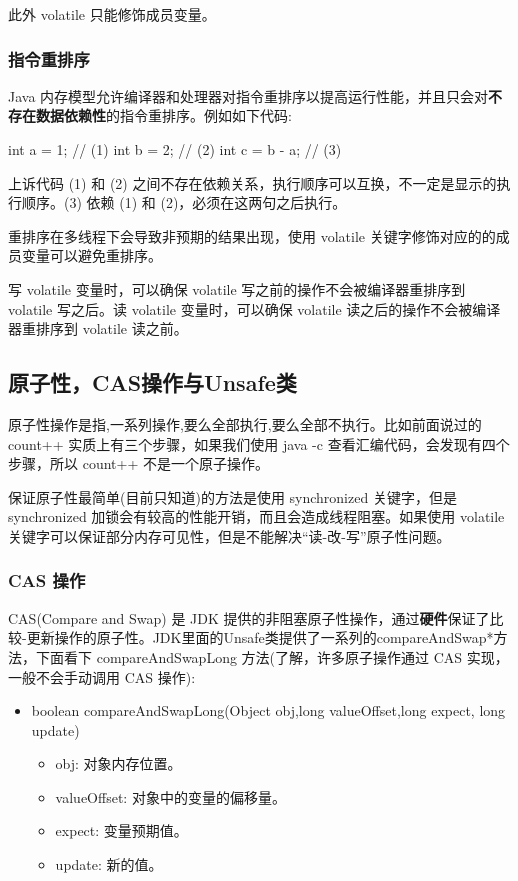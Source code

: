 此外 volatile 只能修饰成员变量。

\subsubsection*{指令重排序}

Java 内存模型允许编译器和处理器对指令重排序以提高运行性能，并且只会对\textbf{不存在数据依赖性}的指令重排序。例如如下代码:

\begin{Java}
int a = 1;      // (1)
int b = 2;      // (2)
int c = b - a;  // (3)
\end{Java}

上诉代码 (1) 和 (2) 之间不存在依赖关系，执行顺序可以互换，不一定是显示的执行顺序。(3) 依赖 (1) 和 (2)，必须在这两句之后执行。

重排序在多线程下会导致非预期的结果出现，使用 volatile 关键字修饰对应的的成员变量可以避免重排序。

写 volatile 变量时，可以确保 volatile 写之前的操作不会被编译器重排序到 volatile 写之后。读 volatile 变量时，可以确保 volatile 读之后的操作不会被编译器重排序到 volatile 读之前。

\subsection{原子性，CAS操作与Unsafe类}

原子性操作是指,一系列操作,要么全部执行,要么全部不执行。比如前面说过的 count++ 实质上有三个步骤，如果我们使用 java -c 查看汇编代码，会发现有四个步骤，所以 count++ 不是一个原子操作。

保证原子性最简单(目前只知道)的方法是使用 synchronized 关键字，但是 synchronized 加锁会有较高的性能开销，而且会造成线程阻塞。如果使用 volatile 关键字可以保证部分内存可见性，但是不能解决``读-改-写''原子性问题。

\subsubsection*{CAS 操作}

CAS(Compare and Swap) 是 JDK 提供的非阻塞原子性操作，通过\textbf{硬件}保证了比较-更新操作的原子性。JDK里面的Unsafe类提供了一系列的compareAndSwap*方法，下面看下 compareAndSwapLong 方法(了解，许多原子操作通过 CAS 实现，一般不会手动调用 CAS 操作):

\begin{itemize}
\item boolean compareAndSwapLong(Object obj,long valueOffset,long expect, long update)
    \begin{itemize}
        \item obj: 对象内存位置。
        \item valueOffset: 对象中的变量的偏移量。
        \item expect: 变量预期值。
        \item update: 新的值。
    \end{itemize}
\end{itemize}

